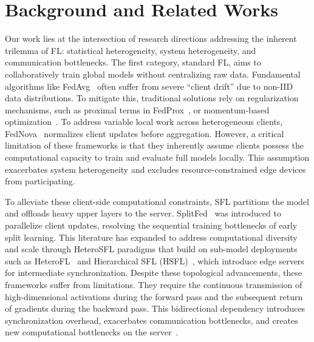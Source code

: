 \section{Background and Related Works}
\label{sec:related_works}
Our work lies at the intersection of research directions addressing the inherent trilemma of FL: statistical heterogeneity, system heterogeneity, and communication bottlenecks. The first category, standard FL, aims to collaboratively train global models without centralizing raw data. Fundamental algorithms like FedAvg~\cite{pmlr-v54-mcmahan17a} often suffer from severe ``client drift'' due to non-IID data distributions. To mitigate this, traditional solutions rely on regularization mechanisms, such as proximal terms in FedProx~\cite{dai2023tacklingFedProx}, or momentum-based optimization~\cite{cheng2024momentumbenefits, zaccone2025communication}. To address variable local work across heterogeneous clients, FedNova~\cite{10.5555/3495724.3496362} normalizes client updates before aggregation. However, a critical limitation of these frameworks is that they inherently assume clients possess the computational capacity to train and evaluate full models locally. This assumption exacerbates system heterogeneity and excludes resource-constrained edge devices from participating.

To alleviate these client-side computational constraints, SFL partitions the model and offloads heavy upper layers to the server. SplitFed~\cite{thapa2022splitfed} was introduced to parallelize client updates, resolving the sequential training bottlenecks of early split learning. This literature has expanded to address computational diversity and scale through HeteroSFL paradigms that build on sub-model deployments such as HeteroFL~\cite{diao2021heterofl} and Hierarchical SFL (HSFL)~\cite{rana2022hierarchical,9148862,9488756}, which introduce edge servers for intermediate synchronization. Despite these topological advancements, these frameworks suffer from limitations. They require the continuous transmission of high-dimensional activations during the forward pass and the subsequent return of gradients during the backward pass. This bidirectional dependency introduces synchronization overhead, exacerbates communication bottlenecks, and creates new computational bottlenecks on the server~\cite{10980018}.

